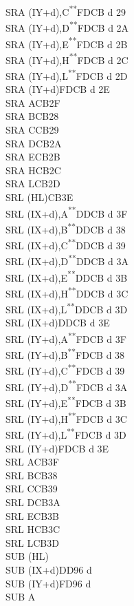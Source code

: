 \documentclass[12pt,twoside,openright,a4paper]{book}
\newcommand{\UNDOC}{\textnormal{\textsuperscript{**}}}
\begin{document}
\begin{multicols}{3}
{\begin{tabbing}
	SRA (IY+d),C\UNDOC\>FDCB d 29\\
	SRA (IY+d),D\UNDOC\>FDCB d 2A\\
	SRA (IY+d),E\UNDOC\>FDCB d 2B\\
	SRA (IY+d),H\UNDOC\>FDCB d 2C\\
	SRA (IY+d),L\UNDOC\>FDCB d 2D\\
	SRA (IY+d)\>FDCB d 2E\\
	SRA A\>CB2F\\
	SRA B\>CB28\\
	SRA C\>CB29\\
	SRA D\>CB2A\\
	SRA E\>CB2B\\
	SRA H\>CB2C\\
	SRA L\>CB2D\\
	SRL (HL)\>CB3E\\
	SRL (IX+d),A\UNDOC\>DDCB d 3F\\
	SRL (IX+d),B\UNDOC\>DDCB d 38\\
	SRL (IX+d),C\UNDOC\>DDCB d 39\\
	SRL (IX+d),D\UNDOC\>DDCB d 3A\\
	SRL (IX+d),E\UNDOC\>DDCB d 3B\\
	SRL (IX+d),H\UNDOC\>DDCB d 3C\\
	SRL (IX+d),L\UNDOC\>DDCB d 3D\\
	SRL (IX+d)\>DDCB d 3E\\
	SRL (IY+d),A\UNDOC\>FDCB d 3F\\
	SRL (IY+d),B\UNDOC\>FDCB d 38\\
	SRL (IY+d),C\UNDOC\>FDCB d 39\\
	SRL (IY+d),D\UNDOC\>FDCB d 3A\\
	SRL (IY+d),E\UNDOC\>FDCB d 3B\\
	SRL (IY+d),H\UNDOC\>FDCB d 3C\\
	SRL (IY+d),L\UNDOC\>FDCB d 3D\\
	SRL (IY+d)\>FDCB d 3E\\
	SRL A\>CB3F\\
	SRL B\>CB38\\
	SRL C\>CB39\\
	SRL D\>CB3A\\
	SRL E\>CB3B\\
	SRL H\>CB3C\\
	SRL L\>CB3D\\
	SUB (HL)\\
	SUB (IX+d)\>DD96 d\\
	SUB (IY+d)\>FD96 d\\
	SUB A\\

\end{tabbing}}
\end{multicols}
\end{document}
